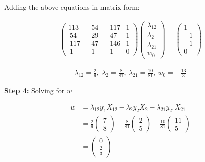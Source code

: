 \documentclass[12pt]{report}
\begin{document}
Adding the above equations in matrix form:

\begin{equation*}
	\begin{aligned}
		\begin{pmatrix}113 & -54 & -117 & 1 \\ \:54&-29&-47&1\\ \:117&-47&-146&1\\ \:1&-1&-1&0\end{pmatrix}\begin{pmatrix}\lambda_{12}\\ \lambda_{2}\\ \lambda_{21}\\ w_{0}\end{pmatrix}=\begin{pmatrix}1\\ -1\\ -1\\ 0\end{pmatrix}
	\end{aligned}
\end{equation*}

\begin{equation*}
	\begin{aligned}
		\lambda_{12}=\frac{2}{9},\:\lambda_{2}=\frac{8}{81},\:\lambda_{21}=\frac{10}{81},\:w_{0}=-\frac{13}{3}
	\end{aligned}
\end{equation*}

\vspace{20pt}
\textbf{Step 4:} Solving for $w$

\begin{equation}
	\begin{aligned}
		w & = \lambda_{12}y_{1}X_{12} - \lambda_{2}y_{2}X_{2} - \lambda_{21}y_{21}X_{21}                                                                                                            \\
		  & = \frac{2}{9}\begin{pmatrix}7                                           \\ 8\end{pmatrix}-\frac{8}{81}\begin{pmatrix}2\\ 5\end{pmatrix}-\frac{10}{81}\begin{pmatrix}11\\ 5\end{pmatrix} \\
		  & = \begin{pmatrix}0                                                      \\ \frac{2}{3}\end{pmatrix}
	\end{aligned}
\end{equation}
\end{document}
